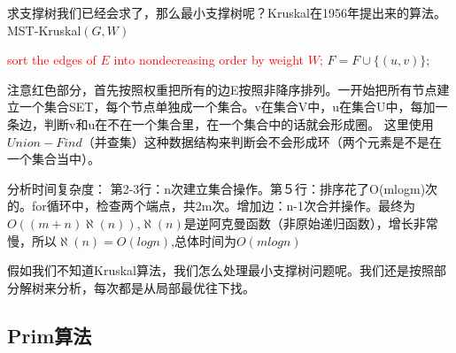 求支撑树我们已经会求了，那么最小支撑树呢？Kruskal在1956年提出来的算法。\\
{\sc MST-Kruskal}$( G, W )$
\begin{algorithmic}[1]
\ENDFOR
\STATE\textcolor{red}{ sort the edges of $E$ into nondecreasing order by weight $W$; }
\STATE $F = F \cup \{ ( u , v ) \};$ 
\ENDIF
\ENDFOR
\end{algorithmic}
注意红色部分，首先按照权重把所有的边E按照非降序排列。一开始把所有节点建立一个集合SET，每个节点单独成一个集合。v在集合V中，u在集合U中，每加一条边，判断v和u在不在一个集合里，在一个集合中的话就会形成圈。
这里使用$Union-Find$（并查集）这种数据结构来判断会不会形成环（两个元素是不是在一个集合当中）。

分析时间复杂度：
第2-3行：n次建立集合操作。第５行：排序花了O(mlogm)次的。for循环中，检查两个端点，共2m次。增加边：n-1次合并操作。最终为$O((m+n)\aleph(n))$,$\aleph(n)$是逆阿克曼函数（非原始递归函数），增长非常慢，所以$\aleph(n)=O(log n)$,总体时间为$O(mlog n)$

假如我们不知道Kruskal算法，我们怎么处理最小支撑树问题呢。我们还是按照部分解树来分析，每次都是从局部最优往下找。

\subsection{Prim算法}

